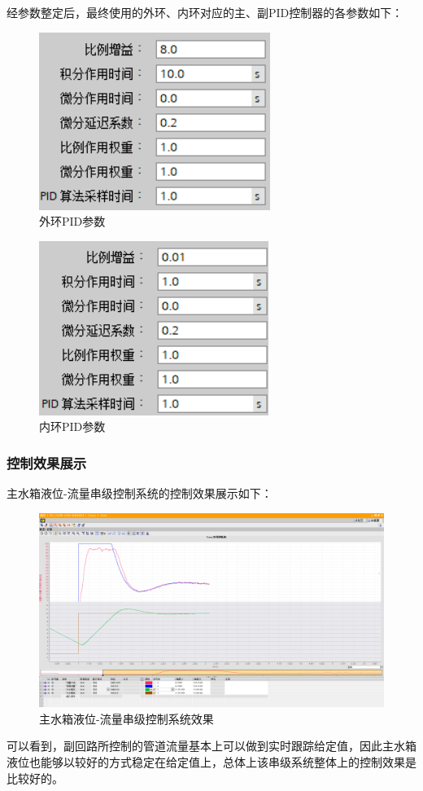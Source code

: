 \documentclass[UTF8]{article}
\begin{document}
经参数整定后，最终使用的外环、内环对应的主、副PID控制器的各参数如下：
\begin{figure}[H]
    \centering %
    \includegraphics[width=.4\textwidth]{figure/串级-外环液位-模块-PID参数.PNG} 
    \caption{外环PID参数} %
\end{figure}
\begin{figure}[H]
    \centering %
    \includegraphics[width=.4\textwidth]{figure/串级-内环流量-模块-PID参数.PNG} 
    \caption{内环PID参数} %
\end{figure}

\subsubsection{控制效果展示}
主水箱液位-流量串级控制系统的控制效果展示如下：
\begin{figure}[H]
    \centering %
    \includegraphics[width=1\textwidth]{figure/串级控制效果.png} 
    \caption{主水箱液位-流量串级控制系统效果} %
\end{figure}
可以看到，副回路所控制的管道流量基本上可以做到实时跟踪给定值，因此主水箱液位也能够以较好的方式稳定在给定值上，总体上该串级系统整体上的控制效果是比较好的。
\end{document}
